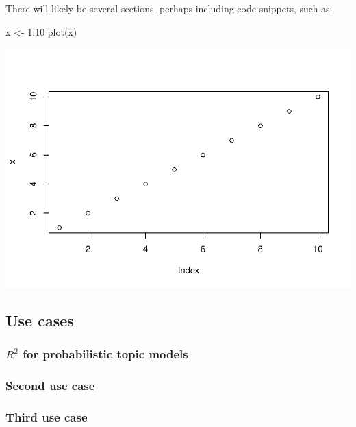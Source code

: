 There will likely be several sections, perhaps including code snippets,
such as:

\begin{Schunk}
\begin{Sinput}
x <- 1:10
plot(x)
\end{Sinput}

\includegraphics{Multivariate-R-Squared_files/figure-latex/unnamed-chunk-1-1} \end{Schunk}

\hypertarget{use-cases}{%
\subsection{Use cases}\label{use-cases}}

\hypertarget{r2-for-probabilistic-topic-models}{%
\subsubsection{\texorpdfstring{\(R^2\) for probabilistic topic
models}{R\^{}2 for probabilistic topic models}}\label{r2-for-probabilistic-topic-models}}

\hypertarget{second-use-case}{%
\subsubsection{Second use case}\label{second-use-case}}

\hypertarget{third-use-case}{%
\subsubsection{Third use case}\label{third-use-case}}

